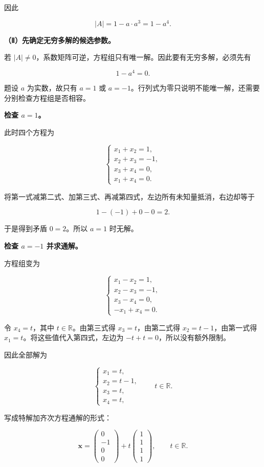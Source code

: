 \documentclass[UTF8,11pt,fontset=windows]{ctexart}
\begin{document}
因此

$$
|A|=1-a\cdot a^3=1-a^4.
$$

\textbf{（Ⅱ）先确定无穷多解的候选参数。}

若 $|A|\ne0$，系数矩阵可逆，方程组只有唯一解。因此要有无穷多解，必须先有

$$
1-a^4=0.
$$

题设 $a$ 为实数，故只有 $a=1$ 或 $a=-1$。行列式为零只说明不能唯一解，还需要分别检查方程组是否相容。

\textbf{检查 $a=1$。}

此时四个方程为

$$
\begin{cases}
x_1+x_2=1,\\
x_2+x_3=-1,\\
x_3+x_4=0,\\
x_1+x_4=0.
\end{cases}
$$

将第一式减第二式、加第三式、再减第四式，左边所有未知量抵消，右边却等于

$$
1-(-1)+0-0=2.
$$

于是得到矛盾 $0=2$。所以 $a=1$ 时无解。

\textbf{检查 $a=-1$ 并求通解。}

方程组变为

$$
\begin{cases}
x_1-x_2=1,\\
x_2-x_3=-1,\\
x_3-x_4=0,\\
-x_1+x_4=0.
\end{cases}
$$

令 $x_4=t$，其中 $t\in\mathbb R$。由第三式得 $x_3=t$，由第二式得 $x_2=t-1$，由第一式得 $x_1=t$。将这些值代入第四式，左边为 $-t+t=0$，所以没有额外限制。

因此全部解为

$$
\begin{cases}
x_1=t,\\x_2=t-1,\\x_3=t,\\x_4=t,
\end{cases}
\qquad t\in\mathbb R.
$$

写成特解加齐次方程通解的形式：

$$
\boldsymbol x=
\begin{pmatrix}0\\-1\\0\\0\end{pmatrix}
+t\begin{pmatrix}1\\1\\1\\1\end{pmatrix},
\qquad t\in\mathbb R.
$$
\end{document}
